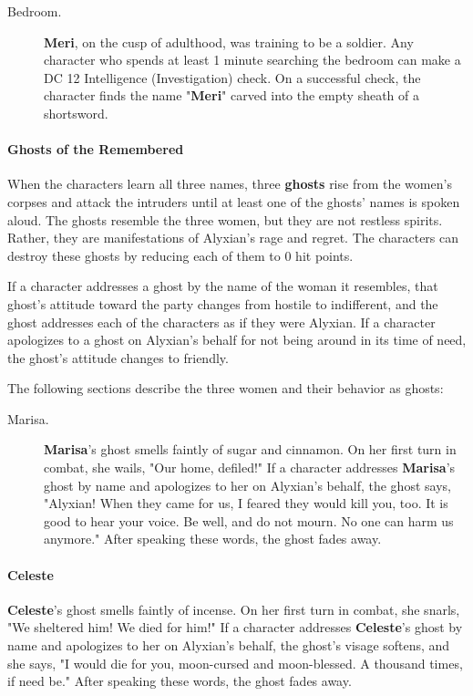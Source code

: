 \documentclass[a4paper, 11pt, bg=full, twocolumn, nooutline]{dndbook}
\begin{document}
\begin{description}
\item[Bedroom.] \textbf{Meri}, on the cusp of adulthood, was training to be a soldier. Any character who spends at least 1 minute searching the bedroom can make a DC 12 Intelligence (Investigation) check. On a successful check, the character finds the name "\textbf{Meri}" carved into the empty sheath of a shortsword.
\end{description}

\paragraph{Ghosts of the Remembered}

When the characters learn all three names, three \textbf{ghosts} rise from the women's corpses and attack the intruders until at least one of the ghosts' names is spoken aloud. The ghosts resemble the three women, but they are not restless spirits. Rather, they are manifestations of Alyxian's rage and regret. The characters can destroy these ghosts by reducing each of them to 0 hit points.

If a character addresses a ghost by the name of the woman it resembles, that ghost's attitude toward the party changes from hostile to indifferent, and the ghost addresses each of the characters as if they were Alyxian. If a character apologizes to a ghost on Alyxian's behalf for not being around in its time of need, the ghost's attitude changes to friendly.

The following sections describe the three women and their behavior as ghosts:

\begin{description}
\item[Marisa.] \textbf{Marisa}'s ghost smells faintly of sugar and cinnamon. On her first turn in combat, she wails, "Our home, defiled!" If a character addresses \textbf{Marisa}'s ghost by name and apologizes to her on Alyxian's behalf, the ghost says, "Alyxian! When they came for us, I feared they would kill you, too. It is good to hear your voice. Be well, and do not mourn. No one can harm us anymore." After speaking these words, the ghost fades away.
\end{description}

\paragraph{Celeste}

\textbf{Celeste}'s ghost smells faintly of incense. On her first turn in combat, she snarls, "We sheltered him! We died for him!" If a character addresses \textbf{Celeste}'s ghost by name and apologizes to her on Alyxian's behalf, the ghost's visage softens, and she says, "I would die for you, moon-cursed and moon-blessed. A thousand times, if need be." After speaking these words, the ghost fades away.
\end{document}
